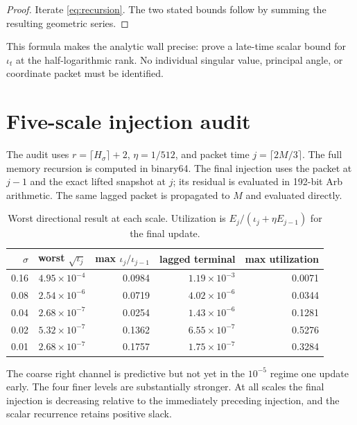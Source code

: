 \documentclass[11pt]{article}
\theoremstyle{remark}
\begin{document}
\begin{proof}
Iterate \eqref{eq:recursion}.  The two stated bounds follow by summing the
resulting geometric series.
\end{proof}

This formula makes the analytic wall precise: prove a late-time scalar bound
for $\iota_t$ at the half-logarithmic rank.  No individual singular value,
principal angle, or coordinate packet must be identified.

\section{Five-scale injection audit}

The audit uses $r=\lceil H_\sigma\rceil+2$, $\eta=1/512$, and packet time
$j=\lceil2M/3\rceil$.  The full memory recursion is computed in binary64.
The final injection uses the packet at $j-1$ and the exact lifted snapshot at
$j$; its residual is evaluated in 192-bit Arb arithmetic.  The same lagged
packet is propagated to $M$ and evaluated directly.

\begin{table}[ht]
\centering
\small
\begin{tabular}{rrrrr}
\toprule
$\sigma$ & worst $\sqrt{\iota_j}$ & max $\iota_j/\iota_{j-1}$ & lagged terminal & max utilization\\
\midrule
0.16 & $4.95\times10^{-4}$ & 0.0984 & $1.19\times10^{-3}$ & 0.0071\\
0.08 & $2.54\times10^{-6}$ & 0.0719 & $4.02\times10^{-6}$ & 0.0344\\
0.04 & $2.68\times10^{-7}$ & 0.0254 & $1.43\times10^{-6}$ & 0.1281\\
0.02 & $5.32\times10^{-7}$ & 0.1362 & $6.55\times10^{-7}$ & 0.5276\\
0.01 & $2.68\times10^{-7}$ & 0.1757 & $1.75\times10^{-7}$ & 0.3284\\
\bottomrule
\end{tabular}
\caption{Worst directional result at each scale.  Utilization is
$E_j/(\iota_j+\eta E_{j-1})$ for the final update.}
\label{tab:audit}
\end{table}

The coarse right channel is predictive but not yet in the $10^{-5}$ regime
one update early.  The four finer levels are substantially stronger.  At all
scales the final injection is decreasing relative to the immediately
preceding injection, and the scalar recurrence retains positive slack.
\end{document}
